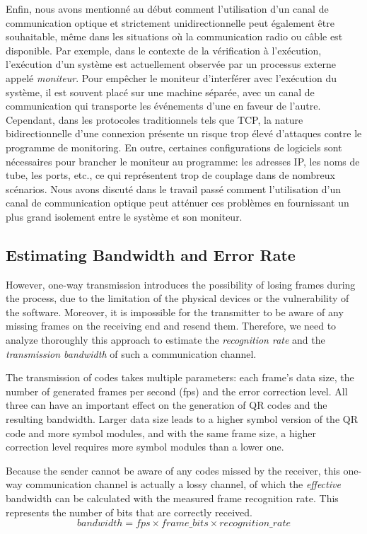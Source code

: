 Enfin, nous avons mentionné au début comment l'utilisation d'un canal de communication optique et strictement unidirectionnelle peut également être souhaitable, même dans les situations où la communication radio ou câble est disponible. Par exemple, dans le contexte de la vérification à l'exécution, l'exécution d'un système est actuellement observée par un processus externe appelé \emph{moniteur}. Pour empêcher le moniteur d'interférer avec l'exécution du système, il est souvent placé sur une machine séparée, avec un canal de communication qui transporte les événements d'une en faveur de l'autre. Cependant, dans les protocoles traditionnels tels que TCP, la nature bidirectionnelle d'une connexion présente un risque trop élevé d'attaques contre le programme de monitoring. En outre, certaines configurations de logiciels sont nécessaires pour brancher le moniteur au programme: les adresses IP, les noms de tube, les ports, etc., ce qui représentent trop de couplage dans de nombreux scénarios. Nous avons discuté dans le travail passé \citep{DBLP_conf /rv/LavoieLVGH14} comment l'utilisation d'un canal de communication optique peut atténuer ces problèmes en fournissant un plus grand isolement entre le système et son moniteur.

\subsection{Estimating Bandwidth and Error Rate}

However, one-way transmission introduces the possibility of losing frames during the process, due to the limitation of the physical devices or the vulnerability of the software. Moreover, it is impossible for the transmitter to be aware of any missing frames on the receiving end and resend them. Therefore, we need to analyze thoroughly this approach to estimate the \emph{recognition rate} and the \emph{transmission bandwidth} of such a communication channel.

The transmission of codes takes multiple parameters: each frame's data size, the number of generated frames per second (fps) and the error correction level. All three can have an important effect on the generation of QR codes and the resulting bandwidth. Larger data size leads to a higher symbol version of the QR code and more symbol modules, and with the same frame size, a higher correction level requires more symbol modules than a lower one.

Because the sender cannot be aware of any codes missed by the receiver, this one-way communication channel is actually a lossy channel, of which the \emph{effective} bandwidth can be calculated with the measured frame recognition rate. This represents the number of bits that are correctly received.
%
\begin{equation*}
  bandwidth = \mathit{fps} \times \mathit{frame\_bits} \times \mathit{recognition\_rate}
\end{equation*}

